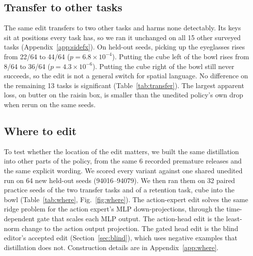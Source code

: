 \documentclass{article}
\begin{document}
\subsection{Transfer to other tasks}
\label{sec:transfer}
The same edit transfers to two other tasks and harms none detectably. Its keys sit at positions every task has, so we ran it unchanged on all 15 other surveyed tasks (Appendix~\ref{app:sidefx}). On held-out seeds, picking up the eyeglasses rises from 22/64 to 44/64 ($p=6.8\times10^{-4}$). Putting the cube left of the bowl rises from 8/64 to 36/64 ($p=4.3\times10^{-6}$). Putting the cube right of the bowl still never succeeds, so the edit is not a general switch for spatial language. No difference on the remaining 13 tasks is significant (Table~\ref{tab:transfer}). The largest apparent loss, on butter on the raisin box, is smaller than the unedited policy's own drop when rerun on the same seeds.

\subsection{Where to edit}
\label{sec:where}
To test whether the location of the edit matters, we built the same distillation into other parts of the policy, from the same 6 recorded premature releases and the same explicit wording. We scored every variant against one shared unedited run on 64 new held-out seeds (94016--94079). We then ran them on 32 paired practice seeds of the two transfer tasks and of a retention task, cube into the bowl (Table~\ref{tab:where}, Fig.~\ref{fig:where}). The action-expert edit solves the same ridge problem for the action expert's MLP down-projections, through the time-dependent gate that scales each MLP output. The action-head edit is the least-norm change to the action output projection. The gated head edit is the blind editor's accepted edit (Section~\ref{sec:blind}), which uses negative examples that distillation does not. Construction details are in Appendix~\ref{app:where}.
\end{document}
